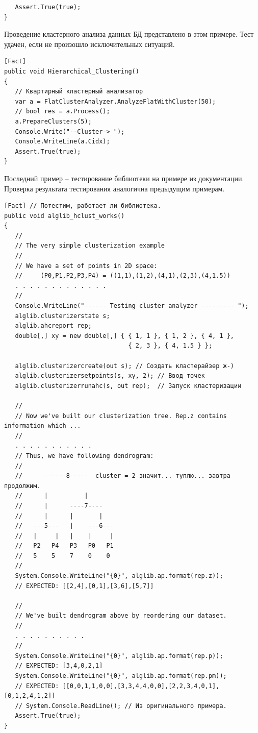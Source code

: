 \documentclass[a4paper,14pt,openany,final]{extreport} %
\begin{document}
{\begin{verbatim}
   Assert.True(true);
}
\end{verbatim}
Проведение кластерного анализа данных БД представлено в этом примере. Тест удачен, если не произошло исключительных ситуаций.
\begin{verbatim}
[Fact]
public void Hierarchical_Clustering()
{
   // Квартирный кластерный анализатор
   var a = FlatClusterAnalyzer.AnalyzeFlatWithCluster(50);
   // bool res = a.Process();
   a.PrepareClusters(5);
   Console.Write("--Cluster-> ");
   Console.WriteLine(a.Cidx);
   Assert.True(true);
}
\end{verbatim}
Последний пример -- тестирование библиотеки на примере из документации. Проверка результата тестирования аналогична предыдущим примерам.
\begin{verbatim}
[Fact] // Потестим, работает ли библиотека.
public void alglib_hclust_works()
{
   //
   // The very simple clusterization example
   //
   // We have a set of points in 2D space:
   //     (P0,P1,P2,P3,P4) = ((1,1),(1,2),(4,1),(2,3),(4,1.5))
   . . . . . . . . . . . . .
   //
   Console.WriteLine("------ Testing cluster analyzer --------- ");
   alglib.clusterizerstate s;
   alglib.ahcreport rep;
   double[,] xy = new double[,] { { 1, 1 }, { 1, 2 }, { 4, 1 },
                                  { 2, 3 }, { 4, 1.5 } };

   alglib.clusterizercreate(out s); // Создать кластерайзер ж-)
   alglib.clusterizersetpoints(s, xy, 2); // Ввод точек
   alglib.clusterizerrunahc(s, out rep);  // Запуск кластеризации

   //
   // Now we've built our clusterization tree. Rep.z contains information which ...
   //
   . . . . . . . . . . .
   // Thus, we have following dendrogram:
   //
   //      ------8-----  cluster = 2 значит... туплю... завтра продолжим.
   //      |          |
   //      |      ----7----
   //      |      |       |
   //   ---5---   |    ---6---
   //   |     |   |    |     |
   //   P2   P4   P3   P0   P1
   //   5    5    7    0    0
   //
   System.Console.WriteLine("{0}", alglib.ap.format(rep.z));
   // EXPECTED: [[2,4],[0,1],[3,6],[5,7]]

   //
   // We've built dendrogram above by reordering our dataset.
   //
   . . . . . . . . . .
   //
   System.Console.WriteLine("{0}", alglib.ap.format(rep.p));
   // EXPECTED: [3,4,0,2,1]
   System.Console.WriteLine("{0}", alglib.ap.format(rep.pm));
   // EXPECTED: [[0,0,1,1,0,0],[3,3,4,4,0,0],[2,2,3,4,0,1],[0,1,2,4,1,2]]
   // System.Console.ReadLine(); // Из оригинального примера.
   Assert.True(true);
}
\end{verbatim}

}
\end{document}
